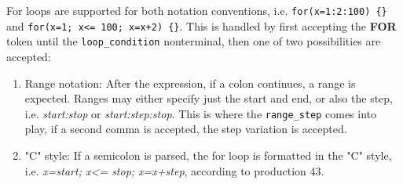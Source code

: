 For loops are supported for both notation conventions, i.e. \texttt{for(x=1:2:100) \{\}} and \texttt{for(x=1; x<= 100; x=x+2) \{\}}. This is handled by first accepting the \textbf{FOR} token until the \texttt{loop\_condition} nonterminal, then one of two possibilities are accepted:
\begin{enumerate}
  \item Range notation: After the expression, if a colon continues, a range is expected. Ranges may either specify just the start and end, or also the step, i.e. \emph{start:stop} or \emph{start:step:stop}. This is where the \texttt{range\_step} comes into play, if a second comma is accepted, the step variation is accepted.
  \item "C" style: If a semicolon is parsed, the for loop is formatted in the "C" style, i.e. \emph{x=start; x<= stop; x=x+step}, according to production 43.
\end{enumerate}



